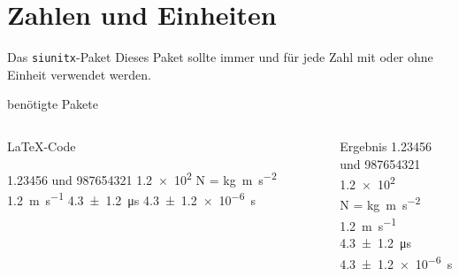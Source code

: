 \section{Zahlen und Einheiten}

\begin{frame}[fragile]{
  Das \texttt{siunitx}-Paket
  \hfill{}
}
  Dieses Paket sollte immer und für jede Zahl mit oder ohne Einheit verwendet werden.

  \begin{block}{benötigte Pakete}
    \begin{lstverbatim}
    \usepackage[locale=DE, separate-uncertainty=true, per-mode=fraction]
    {siunitx}
    \end{lstverbatim}
  \end{block}
  \begin{columns}[T]
    \begin{column}{0.6\textwidth}
      \begin{block}{\LaTeX-Code}
        \begin{lstverbatim}
        \num{1.23456} und \num{987654321}
        \num{1.2e2}
        \si{\newton} = \si{\kilo\gram\metre\per\second\squared}
        \SI{1.2}{\metre\per\second}
        \SI{4.3(12)}{\micro\second}
        \SI{4.3(12)e-6}{\second}
        \end{lstverbatim}
      \end{block}
    \end{column}
    \begin{column}{0.35\textwidth}
      \begin{block}{Ergebnis}
        \num{1.23456} und \num{987654321} \\
        \num{1.2e2} \\
        \smallbreak
        \si{\newton} = \si{\kilo\gram\metre\per\second\squared} \\
        \medbreak
        \SI{1.2}{\metre\per\second} \\
        \SI{4.3(12)}{\micro\second}
        \SI{4.3(12)e-6}{\second}
      \end{block}
    \end{column}
  \end{columns}
\end{frame}
